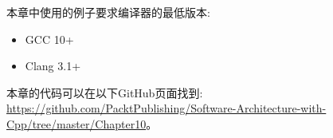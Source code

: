 
本章中使用的例子要求编译器的最低版本:

\begin{itemize}
\item 
GCC 10+

\item 
Clang 3.1+
\end{itemize}

本章的代码可以在以下GitHub页面找到: \url{https://github.com/PacktPublishing/Software-Architecture-with-Cpp/tree/master/Chapter10}。
